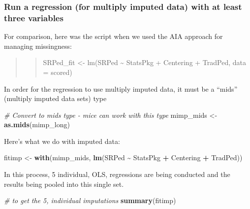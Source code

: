 \documentclass[
  11pt,
]{book}
\newenvironment{Shaded}{\begin{snugshade}}{\end{snugshade}}
\newcommand{\CommentTok}[1]{\textcolor[rgb]{0.37,0.37,0.37}{\textit{#1}}}
\newcommand{\FunctionTok}[1]{\textcolor[rgb]{0.27,0.27,0.27}{\textbf{#1}}}
\newcommand{\NormalTok}[1]{#1}
\newcommand{\OtherTok}[1]{\textcolor[rgb]{0.37,0.37,0.37}{#1}}
\newcommand{\SpecialCharTok}[1]{\textcolor[rgb]{0.43,0.43,0.43}{\textbf{#1}}}
\begin{document}
\hypertarget{run-a-regression-for-multiply-imputed-data-with-at-least-three-variables}{%
\subsubsection{Run a regression (for multiply imputed data) with at least three variables}\label{run-a-regression-for-multiply-imputed-data-with-at-least-three-variables}}

For comparison, here was the script when we used the AIA approach for managing missingness:

\begin{quote}
\begin{quote}
SRPed\_fit \textless- lm(SRPed \textasciitilde{} StatsPkg + Centering + TradPed, data = scored)
\end{quote}
\end{quote}

In order for the regression to use multiply imputed data, it must be a ``mids'' (multiply imputed data sets) type

\begin{Shaded}
\begin{Highlighting}[]
\CommentTok{\# Convert to mids type {-} mice can work with this type}
\NormalTok{mimp\_mids }\OtherTok{\textless{}{-}} \FunctionTok{as.mids}\NormalTok{(mimp\_long)}
\end{Highlighting}
\end{Shaded}

Here's what we do with imputed data:

\begin{Shaded}
\begin{Highlighting}[]
\NormalTok{fitimp }\OtherTok{\textless{}{-}} \FunctionTok{with}\NormalTok{(mimp\_mids, }\FunctionTok{lm}\NormalTok{(SRPed }\SpecialCharTok{\textasciitilde{}}\NormalTok{ StatsPkg }\SpecialCharTok{+}\NormalTok{ Centering }\SpecialCharTok{+}\NormalTok{ TradPed))}
\end{Highlighting}
\end{Shaded}

In this process, 5 individual, OLS, regressions are being conducted and the results being pooled into this single set.

\begin{Shaded}
\begin{Highlighting}[]
\CommentTok{\# to get the 5, individual imputations}
\FunctionTok{summary}\NormalTok{(fitimp)}
\end{Highlighting}
\end{Shaded}
\end{document}
